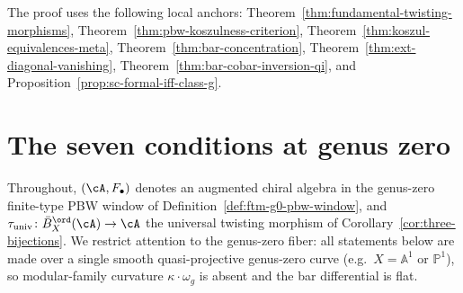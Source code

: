 The proof uses the following local anchors:
Theorem~\ref{thm:fundamental-twisting-morphisms},
Theorem~\ref{thm:pbw-koszulness-criterion},
Theorem~\ref{thm:koszul-equivalences-meta},
Theorem~\ref{thm:bar-concentration},
Theorem~\ref{thm:ext-diagonal-vanishing},
Theorem~\ref{thm:bar-cobar-inversion-qi}, and
Proposition~\ref{prop:sc-formal-iff-class-g}.

\section{The seven conditions at genus zero}
\label{sec:ftm-seven-conditions}

Throughout, $(\cA,F_\bullet)$ denotes an augmented chiral algebra in
the genus-zero finite-type PBW window of
Definition~\ref{def:ftm-g0-pbw-window}, and
$\tau_{\mathrm{univ}}\colon \bar{B}^{\ord}_X(\cA) \to \cA$ the
universal twisting morphism of
Corollary~\ref{cor:three-bijections}. We restrict attention to the
genus-zero fiber: all statements below are made over a single smooth
quasi-projective genus-zero curve (e.g.\ $X = \mathbb{A}^1$ or
$\mathbb{P}^1$), so modular-family curvature $\kappa \cdot \omega_g$
is absent and the bar differential is flat.

